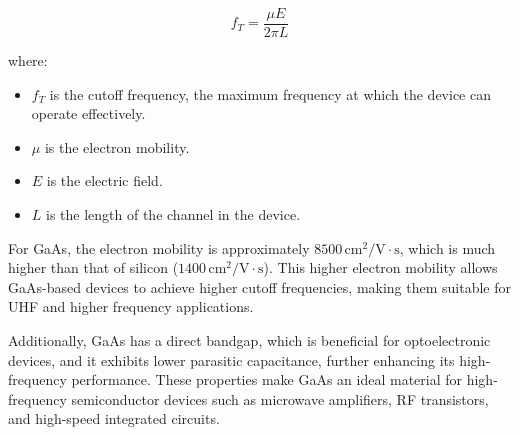 \[
f_T = \frac{\mu E}{2 \pi L}
\]

where:
\begin{itemize}
    \item \(f_T\) is the cutoff frequency, the maximum frequency at which the device can operate effectively.
    \item \(\mu\) is the electron mobility.
    \item \(E\) is the electric field.
    \item \(L\) is the length of the channel in the device.
\end{itemize}

For GaAs, the electron mobility is approximately \(8500 \, \text{cm}^2/\text{V}\cdot\text{s}\), which is much higher than that of silicon (\(1400 \, \text{cm}^2/\text{V}\cdot\text{s}\)). This higher electron mobility allows GaAs-based devices to achieve higher cutoff frequencies, making them suitable for UHF and higher frequency applications.

Additionally, GaAs has a direct bandgap, which is beneficial for optoelectronic devices, and it exhibits lower parasitic capacitance, further enhancing its high-frequency performance. These properties make GaAs an ideal material for high-frequency semiconductor devices such as microwave amplifiers, RF transistors, and high-speed integrated circuits.

